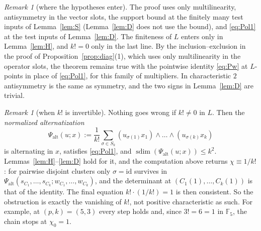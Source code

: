 \documentclass[11pt]{amsart}
\theoremstyle{definition}
\theoremstyle{remark}
\newtheorem{remark}[theorem]{Remark}
\numberwithin{equation}{section}
\newcommand{\F}{\mathbb{F}}
\newcommand{\id}{\mathrm{id}}
\newcommand{\sdim}{\operatorname{sdim}}
\begin{document}
\begin{remark}[where the hypotheses enter]\label{rem:FFhyp}
The proof uses only multilinearity, antisymmetry in the vector slots, the support bound at the finitely many test
inputs of Lemma~\ref{lem:S} (Lemma~\ref{lem:D} does not use the bound), and \eqref{eq:Pol1} at the test inputs of
Lemma~\ref{lem:D}. The finiteness of $L$ enters only in Lemma~\ref{lem:H}, and $k!=0$ only in the last line. By
the inclusion--exclusion in the proof of Proposition~\ref{prop:diag}(1), which uses only multilinearity in the
operator slots, the theorem remains true with the pointwise identity \eqref{eq:Pw} at $L$\nobreakdash-points in place of
\eqref{eq:Pol1}, for this family of multipliers. In characteristic $2$ antisymmetry is the same as symmetry, and the two signs in
Lemma~\ref{lem:D} are trivial.
\end{remark}

\begin{remark}[when $k!$ is invertible]\label{rem:FFunit}
Nothing goes wrong if $k!\ne0$ in $L$. Then the \emph{normalized alternatization}
\[
\Psi_{\mathrm{alt}}(u;x):=\frac1{k!}\sum_{\sigma\in S_k}(u_{\sigma(1)}x_1)\wedge\dots\wedge(u_{\sigma(k)}x_k)
\]
is alternating in $x$, satisfies \eqref{eq:Pol1}, and $\sdim(\Psi_{\mathrm{alt}}(u;x))\le k^2$. Lemmas~\ref{lem:H}--\ref{lem:D}
hold for it, and the computation above returns $\chi\equiv1/k!$: for pairwise disjoint clusters only $\sigma=\id$
survives in $\Psi_{\mathrm{alt}}(s_{C_1},\dots,s_{C_k};w_{C_1},\dots,w_{C_k})$, and the determinant at
$(C_1(1),\dots,C_k(1))$ is that of the identity. The final equation $k!\cdot(1/k!)=1$ is then consistent. So the
obstruction is exactly the vanishing of $k!$, not positive characteristic as such. For example, at $(p,k)=(5,3)$ every
step holds and, since $3!=6=1$ in $\F_5$, the chain stops at $\chi_0=1$.
\end{remark}
\end{document}
